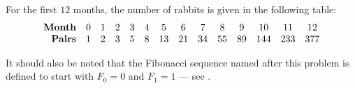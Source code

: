\begin{example}
  For the first \( 12 \) months, the number of rabbits is given in the following table:
  \begin{equation*}
    \begin{array}{r *{13}{c}}
      \textbf{Month} & 0 & 1 & 2 & 3 & 4 & 5  & 6  & 7  & 8  & 9  & 10  & 11  & 12  \\
      \textbf{Pairs} & 1 & 2 & 3 & 5 & 8 & 13 & 21 & 34 & 55 & 89 & 144 & 233 & 377 \\
    \end{array}
  \end{equation*}

  It should also be noted that the Fibonacci sequence named after this problem is defined to start with \( F_0 = 0 \) and \( F_1 = 1 \) --- see .
\end{example}
